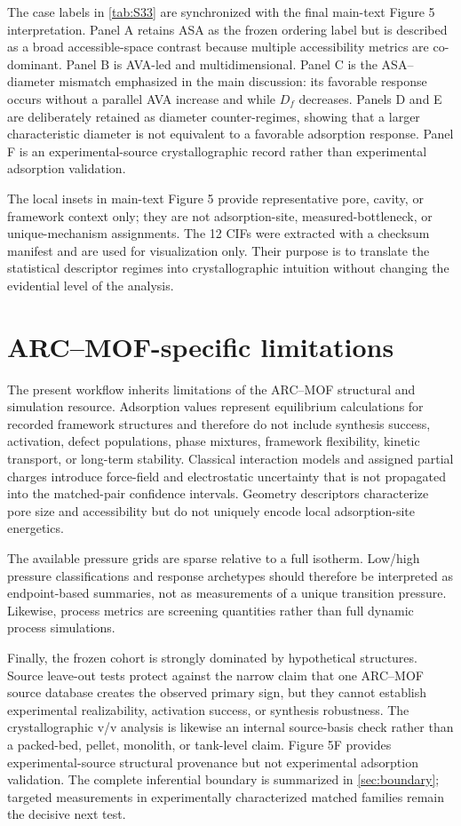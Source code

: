 \documentclass[11pt,a4paper]{article}
\begin{document}
The case labels in \cref{tab:S33} are synchronized with the final main-text
Figure 5 interpretation. Panel A retains ASA as the frozen ordering label but is
described as a broad accessible-space contrast because multiple accessibility
metrics are co-dominant. Panel B is AVA-led and multidimensional. Panel C is the
ASA--diameter mismatch emphasized in the main discussion: its favorable response
occurs without a parallel AVA increase and while $D_f$ decreases. Panels D and E
are deliberately retained as diameter counter-regimes, showing that a larger
characteristic diameter is not equivalent to a favorable adsorption response.
Panel F is an experimental-source crystallographic record rather than experimental
adsorption validation.

The local insets in main-text Figure 5 provide representative pore, cavity, or
framework context only; they are not adsorption-site, measured-bottleneck, or
unique-mechanism assignments. The 12 CIFs were extracted with a checksum manifest
and are used for visualization only. Their purpose is to translate the statistical
descriptor regimes into crystallographic intuition without changing the evidential
level of the analysis.

\section{ARC--MOF-specific limitations}
\label{sec:limitations}

The present workflow inherits limitations of the ARC--MOF structural and simulation
resource. Adsorption values represent equilibrium calculations for recorded
framework structures and therefore do not include synthesis success, activation,
defect populations, phase mixtures, framework flexibility, kinetic transport, or
long-term stability. Classical interaction models and assigned partial charges
introduce force-field and electrostatic uncertainty that is not propagated into
the matched-pair confidence intervals. Geometry descriptors characterize pore size
and accessibility but do not uniquely encode local adsorption-site energetics.

The available pressure grids are sparse relative to a full isotherm. Low/high
pressure classifications and response archetypes should therefore be interpreted as
endpoint-based summaries, not as measurements of a unique transition pressure.
Likewise, process metrics are screening quantities rather than full dynamic
process simulations.

Finally, the frozen cohort is strongly dominated by hypothetical structures.
Source leave-out tests protect against the narrow claim that one ARC--MOF source
database creates the observed primary sign, but they cannot establish experimental
realizability, activation success, or synthesis robustness. The crystallographic
v/v analysis is likewise an internal source-basis check rather than a packed-bed,
pellet, monolith, or tank-level claim. Figure 5F provides experimental-source
structural provenance but not experimental adsorption validation. The complete
inferential boundary is summarized in \cref{sec:boundary}; targeted measurements in
experimentally characterized matched families remain the decisive next test.
\end{document}
